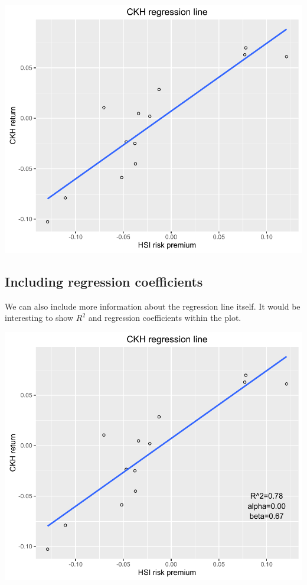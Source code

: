 \begin{center}\includegraphics[width=0.6\linewidth]{11_Linear_Regression_Plot_pdf/lr_9-1} \end{center}

\subsection{Including regression
coefficients}\label{including-regression-coefficients}

We can also include more information about the regression line itself.
It would be interesting to show \(R^2\) and regression coefficients
within the plot.

\begin{Shaded}
\begin{Highlighting}[]
\StringTok{ }\StringTok{ }\NormalTok{(}\NormalTok{, }\NormalTok{, }\NormalTok{-}\NormalTok{, } \NormalTok{) +}\StringTok{ }
\StringTok{  }\NormalTok{(}\NormalTok{, }\NormalTok{, }\NormalTok{-}\NormalTok{, } \NormalTok{) +}\StringTok{ }
\StringTok{  }\NormalTok{(}\NormalTok{, }\NormalTok{, }\NormalTok{-}\NormalTok{, } \NormalTok{)}
\end{Highlighting}
\end{Shaded}

\begin{center}\includegraphics[width=0.6\linewidth]{11_Linear_Regression_Plot_pdf/lr_10-1} \end{center}

